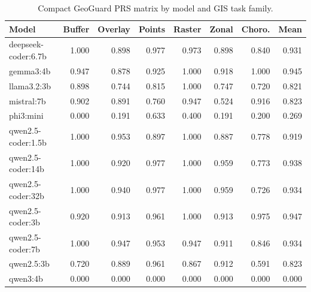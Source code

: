 \begin{table}[H]
\centering
\caption{Compact GeoGuard PRS matrix by model and GIS task family.}
\label{tab:geoguard-model-family-matrix}
\small
\setlength{\tabcolsep}{3pt}
\begin{tabular}{lrrrrrrr}
\toprule
Model & Buffer & Overlay & Points & Raster & Zonal & Choro. & Mean \\
\midrule
deepseek-coder:6.7b & 1.000 & 0.898 & 0.977 & 0.973 & 0.898 & 0.840 & 0.931 \\
gemma3:4b & 0.947 & 0.878 & 0.925 & 1.000 & 0.918 & 1.000 & 0.945 \\
llama3.2:3b & 0.898 & 0.744 & 0.815 & 1.000 & 0.747 & 0.720 & 0.821 \\
mistral:7b & 0.902 & 0.891 & 0.760 & 0.947 & 0.524 & 0.916 & 0.823 \\
phi3:mini & 0.000 & 0.191 & 0.633 & 0.400 & 0.191 & 0.200 & 0.269 \\
qwen2.5-coder:1.5b & 1.000 & 0.953 & 0.897 & 1.000 & 0.887 & 0.778 & 0.919 \\
qwen2.5-coder:14b & 1.000 & 0.920 & 0.977 & 1.000 & 0.959 & 0.773 & 0.938 \\
qwen2.5-coder:32b & 1.000 & 0.940 & 0.977 & 1.000 & 0.959 & 0.726 & 0.934 \\
qwen2.5-coder:3b & 0.920 & 0.913 & 0.961 & 1.000 & 0.913 & 0.975 & 0.947 \\
qwen2.5-coder:7b & 1.000 & 0.947 & 0.953 & 0.947 & 0.911 & 0.846 & 0.934 \\
qwen2.5:3b & 0.720 & 0.889 & 0.961 & 0.867 & 0.912 & 0.591 & 0.823 \\
qwen3:4b & 0.000 & 0.000 & 0.000 & 0.000 & 0.000 & 0.000 & 0.000 \\
\bottomrule
\end{tabular}
\end{table}
